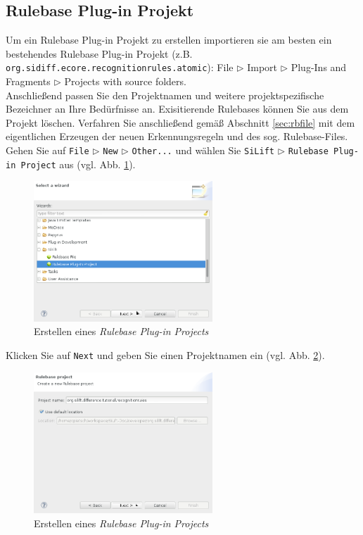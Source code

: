 \subsection{Rulebase Plug-in Projekt}

Um ein Rulebase Plug-in Projekt zu erstellen importieren sie am besten ein bestehendes Rulebase Plug-in Projekt (z.B. \texttt{org.sidiff.ecore.recognitionrules.atomic}): File $\triangleright$ Import $\triangleright$ Plug-Ins and Fragments $\triangleright$ Projects with source folders.\\
Anschließend passen Sie den Projektnamen und weitere projektspezifische Bezeichner an Ihre Bedürfnisse an. Exisitierende Rulebases können Sie aus dem Projekt löschen. Verfahren Sie anschließend gemäß Abschnitt \ref{sec:rbfile} mit dem eigentlichen Erzeugen der neuen Erkennungsregeln und des sog. Rulebase-Files.\\


Gehen Sie auf \texttt{File} $\triangleright$ \texttt{New} $\triangleright$ \texttt{Other...} und wählen Sie \texttt{SiLift} $\triangleright$ \texttt{Rulebase Plug-in Project} aus (vgl. Abb. \ref{silift-wizard_rulebase_page01}).
 
\begin{figure}[H]
\centering
\includegraphics[width=0.6\textwidth]{recognitionrules/graphics/silift-wizard_rulebase_page01.png}
\caption{Erstellen eines \textit{Rulebase Plug-in Projects}}
\label{silift-wizard_rulebase_page01}
\end{figure}

Klicken Sie auf \texttt{Next} und geben Sie einen Projektnamen ein (vgl. Abb. \ref{silift-wizard_rulebase_page02}).

\begin{figure}[H]
\centering
\includegraphics[width=0.6\textwidth]{recognitionrules/graphics/silift-wizard_rulebase_page02.png}
\caption{Erstellen eines \textit{Rulebase Plug-in Projects}}
\label{silift-wizard_rulebase_page02}
\end{figure}

